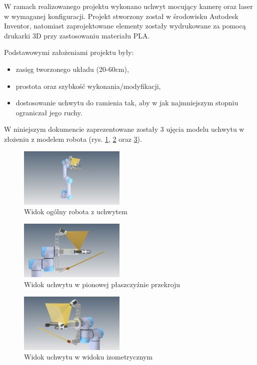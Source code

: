 \documentclass[conference]{IEEEtran}
\begin{document}
W ramach realizowanego projektu wykonano uchwyt mocujący kamerę oraz laser w wymaganej konfiguracji. Projekt stworzony został w środowisku Autodesk Inventor, natomiast zaprojektowane elementy zostały wydrukowane za pomocą drukarki 3D przy zastosowaniu materiału PLA.


Podstawowymi założeniami projektu były:
\begin{itemize}
	\item zasięg tworzonego układu (20-60cm),
	\item prostota oraz szybkość wykonania/modyfikacji,
	\item dostosowanie uchwytu do ramienia tak, aby w jak najmniejszym stopniu ograniczał jego ruchy.
\end{itemize}

W niniejszym dokumencie zaprezentowane zostały 3 ujęcia modelu uchwytu w złożeniu z modelem robota (rys. \ref{fig:widok_robot_1}, \ref{fig:widok_robot_2} oraz \ref{fig:widok_robot_3}).

\begin{figure}[ht!]
	\includegraphics[width=0.45\textwidth]{figures/widok_robot_1.png}
	\centering
	\caption{Widok ogólny robota z uchwytem}
	\label{fig:widok_robot_1}
\end{figure}

\begin{figure}[ht!]
	\includegraphics[width=0.45\textwidth]{figures/widok_robot_2.png}
	\centering
	\caption{Widok uchwytu w pionowej płaszczyźnie przekroju}
	\label{fig:widok_robot_2}
\end{figure}

\begin{figure}[ht!]
	\includegraphics[width=0.45\textwidth]{figures/widok_robot_3.png}
	\centering
	\caption{Widok uchwytu w widoku izometrycznym}
	\label{fig:widok_robot_3}
\end{figure}
\end{document}
